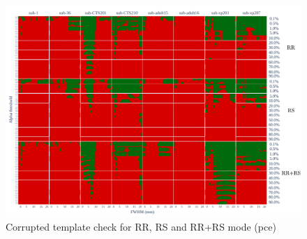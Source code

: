 \documentclass{article}
\begin{document}
\begin{appendices}
    \begin{figure}
        \centering
        \includegraphics[width=\linewidth]{figures/template/template_pce.pdf}
        \caption{Corrupted template check for RR, RS and RR+RS mode (pce)}
    \end{figure}

    \begin{landscape}
        \begin{figure}


\end{figure}
\end{landscape}
\end{appendices}
\end{document}
